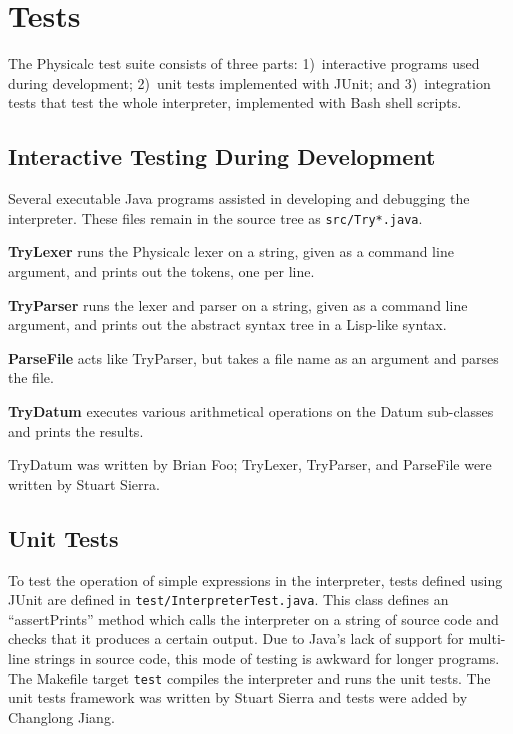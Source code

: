\chapter{Tests}

The Physicalc test suite consists of three parts: 1)~interactive
programs used during development; 2)~unit tests implemented with
JUnit; and 3)~integration tests that test the whole interpreter,
implemented with Bash shell scripts.

\section{Interactive Testing During Development}

Several executable Java programs assisted in developing and debugging
the interpreter.  These files remain in the source tree as
\texttt{src/Try*.java}.

\textbf{TryLexer} runs the Physicalc lexer on a string, given as a
command line argument, and prints out the tokens, one per line.

\textbf{TryParser} runs the lexer and parser on a string, given as a
command line argument, and prints out the abstract syntax tree in a
Lisp-like syntax.

\textbf{ParseFile} acts like TryParser, but takes a file name as an
argument and parses the file.

\textbf{TryDatum} executes various arithmetical operations on the
Datum sub-classes and prints the results.

TryDatum was written by Brian Foo; TryLexer, TryParser, and ParseFile
were written by Stuart Sierra.



\section{Unit Tests}

To test the operation of simple expressions in the interpreter, tests
defined using JUnit\cite{junit} are defined in
\texttt{test/InterpreterTest.java}.  This class defines an
``assertPrints'' method which calls the interpreter on a string of
source code and checks that it produces a certain output.  Due to
Java's lack of support for multi-line strings in source code, this
mode of testing is awkward for longer programs.  The Makefile target
\texttt{test} compiles the interpreter and runs the unit tests.  The
unit tests framework was written by Stuart Sierra and tests were added
by Changlong Jiang.



